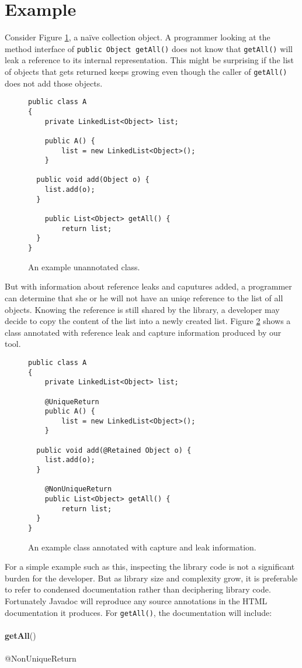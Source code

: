 \section{Example}
\label{sec:Example}

Consider Figure \ref{fig:pre}, a na\"ive collection object.
A programmer looking at the method interface of 
\texttt{public Object getAll()} does not know
that \texttt{getAll()} will leak a reference to its
internal representation. This might be surprising
if the list of objects that gets returned keeps growing
even though the caller of \texttt{getAll()} does not add those objects.

\begin{figure}[h]
\begin{lstlisting}
public class A
{
	private LinkedList<Object> list;
		
	public A() {
		list = new LinkedList<Object>();
	}
		
  public void add(Object o) {
   	list.add(o);
  }
    
	public List<Object> getAll() {
		return list;
  }
}
\end{lstlisting}
\label{fig:pre}
\caption{An example unannotated class.}
\end{figure}

But with information about reference leaks and caputures added, a programmer can 
determine that she or he will not have an uniqe reference
to the list of all objects.  Knowing the reference is still shared by the
library, a developer may decide to copy the content 
of the list into a newly created list.  Figure \ref{fig:postannotation}
shows a class annotated with reference leak and capture information produced by
our tool.

\begin{figure}[h]
\begin{lstlisting}
public class A
{
	private LinkedList<Object> list;
	
	@UniqueReturn
	public A() {
		list = new LinkedList<Object>();
	}
		
  public void add(@Retained Object o) {
   	list.add(o);
  }
  
	@NonUniqueReturn
	public List<Object> getAll() {
		return list;
  }
}
\end{lstlisting}
\label{fig:postannotation}
\caption{An example class annotated with capture and leak information.}
\end{figure}

For a simple example such as this, inspecting the library code is not a
significant burden for the developer.  But as library size and complexity grow,
it is preferable to refer to condensed documentation rather than
deciphering library code.
Fortunately Javadoc will reproduce any source annotations in the HTML
documentation it produces.  For \texttt{getAll()}, the documentation will
include:\\
\\
{\bf getAll}()\\
\\
@NonUniqueReturn\\
